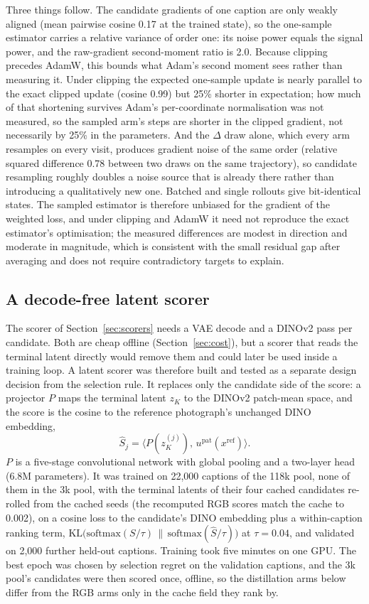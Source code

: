 \documentclass[11pt,a4paper]{article}
\begin{document}
Three things follow. The candidate gradients of one caption are only weakly aligned (mean pairwise cosine 0.17 at the trained state), so the one-sample estimator carries a relative variance of order one: its noise power equals the signal power, and the raw-gradient second-moment ratio is 2.0. Because clipping precedes AdamW, this bounds what Adam's second moment sees rather than measuring it. Under clipping the expected one-sample update is nearly parallel to the exact clipped update (cosine 0.99) but 25\% shorter in expectation; how much of that shortening survives Adam's per-coordinate normalisation was not measured, so the sampled arm's steps are shorter in the clipped gradient, not necessarily by 25\% in the parameters. And the $\Delta$ draw alone, which every arm resamples on every visit, produces gradient noise of the same order (relative squared difference 0.78 between two draws on the same trajectory), so candidate resampling roughly doubles a noise source that is already there rather than introducing a qualitatively new one. Batched and single rollouts give bit-identical states. The sampled estimator is therefore unbiased for the gradient of the weighted loss, and under clipping and AdamW it need not reproduce the exact estimator's optimisation; the measured differences are modest in direction and moderate in magnitude, which is consistent with the small residual gap after averaging and does not require contradictory targets to explain.

\subsection{A decode-free latent scorer}
\label{sec:latent}
The scorer of Section~\ref{sec:scorers} needs a VAE decode and a DINOv2 pass per candidate. Both are cheap offline (Section~\ref{sec:cost}), but a scorer that reads the terminal latent directly would remove them and could later be used inside a training loop. A latent scorer was therefore built and tested as a separate design decision from the selection rule. It replaces only the candidate side of the score: a projector $P$ maps the terminal latent $z_K$ to the DINOv2 patch-mean space, and the score is the cosine to the reference photograph's unchanged DINO embedding,
\begin{equation}
\hat S_j=\big\langle P(z_K^{(j)}),\,u^{\mathrm{pat}}(x^{\mathrm{ref}})\big\rangle .
\end{equation}
$P$ is a five-stage convolutional network with global pooling and a two-layer head (6.8M parameters). It was trained on 22,000 captions of the 118k pool, none of them in the 3k pool, with the terminal latents of their four cached candidates re-rolled from the cached seeds (the recomputed RGB scores match the cache to 0.002), on a cosine loss to the candidate's DINO embedding plus a within-caption ranking term, $\mathrm{KL}\big(\mathrm{softmax}(S/\tau)\,\|\,\mathrm{softmax}(\hat S/\tau)\big)$ at $\tau=0.04$, and validated on 2,000 further held-out captions. Training took five minutes on one GPU. The best epoch was chosen by selection regret on the validation captions, and the 3k pool's candidates were then scored once, offline, so the distillation arms below differ from the RGB arms only in the cache field they rank by.
\end{document}

